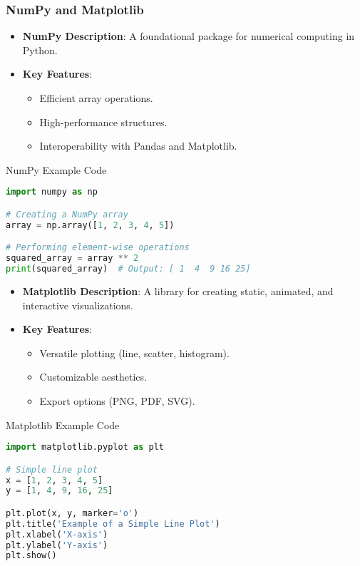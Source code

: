 \documentclass[aspectratio=169]{beamer}
\begin{document}
\begin{frame}[fragile]
    \frametitle{NumPy and Matplotlib}
    \begin{itemize}
        \item \textbf{NumPy Description}: A foundational package for numerical computing in Python.
        \item \textbf{Key Features}:
        \begin{itemize}
            \item Efficient array operations.
            \item High-performance structures.
            \item Interoperability with Pandas and Matplotlib.
        \end{itemize}
    \end{itemize}

    \begin{block}{NumPy Example Code}
        \begin{lstlisting}[language=Python]
import numpy as np

# Creating a NumPy array
array = np.array([1, 2, 3, 4, 5])

# Performing element-wise operations
squared_array = array ** 2
print(squared_array)  # Output: [ 1  4  9 16 25]
        \end{lstlisting}
    \end{block}
    
    \begin{itemize}
        \item \textbf{Matplotlib Description}: A library for creating static, animated, and interactive visualizations.
        \item \textbf{Key Features}:
        \begin{itemize}
            \item Versatile plotting (line, scatter, histogram).
            \item Customizable aesthetics.
            \item Export options (PNG, PDF, SVG).
        \end{itemize}
    \end{itemize}

    \begin{block}{Matplotlib Example Code}
        \begin{lstlisting}[language=Python]
import matplotlib.pyplot as plt

# Simple line plot
x = [1, 2, 3, 4, 5]
y = [1, 4, 9, 16, 25]

plt.plot(x, y, marker='o')
plt.title('Example of a Simple Line Plot')
plt.xlabel('X-axis')
plt.ylabel('Y-axis')
plt.show()
        \end{lstlisting}
    \end{block}
\end{frame}
\end{document}
